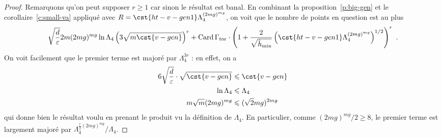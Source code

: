 \begin{proof}
  Remarquons qu'on peut supposer \( r \ge 1 \) car sinon le résultat est
  banal.  En combinant la proposition~\vref{p:big-gen} et le
  corollaire~\vref{c:small-va} appliqué avec \( R = \cst{ht-v-gen1}
    \Lambda_4^{(2mg)^{mg}} \), on voit que le nombre de
  points en question est au plus
  \begin{equation}
    \sqrt{\frac \adeg \eps}
    2 m
    (2mg)^{mg}
    \ln \Lambda_4
    \left( 3 \sqrt{ m \cst{v-gen} } \right)^r
    +
    \card \Gamma_\torsion
    \cdot
    \left( 1 + \frac2{\sqrt{\hmin}}
      \left(
        \cst{ht-v-gen1} \Lambda_4^{(2mg)^{mg}}
      \right)^{1/2}
    \right)^r
    \pmm.
  \end{equation}
  On voit facilement que le premier terme est majoré par \( \Lambda_4^{3r} \)
  : en effet, on a
  \begin{align}
    6 \sqrt{\frac \adeg \eps}
    \cdot \sqrt{ \cst{v-gen} }
    & \le
    \cst{v-gen}
    \\
    \ln \Lambda_4
    & \le
    \Lambda_4
    \\
    m \sqrt m
    (2mg)^{mg}
    & \le
    (\sqrt2 m g)^{2mg}
  \end{align}
  qui donne bien le résultat voulu en prenant le produit vu la définition de
  \( \Lambda_4 \). En particulier, comme \( (2mg)^{mg} /
    2 \ge 8 \), le premier terme est largement majoré par \( \Lambda_4^{ \frac
      r2 (2mg)^{mg} } / \Lambda_4 \).


\end{proof}
